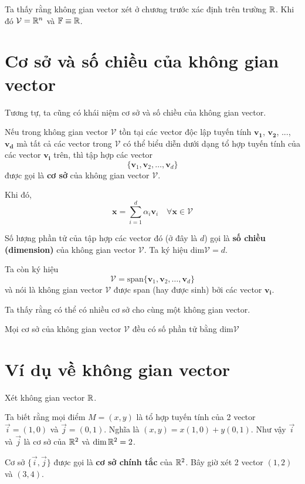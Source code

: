 Ta thấy rằng không gian vector xét ở chương trước xác định trên trường $\mathbb{R}$.
Khi đó $\mathcal{V} = \mathbb{R}^n$ và $\mathbb{F} \equiv \mathbb{R}$.

\section{Cơ sở và số chiều của không gian vector}

Tương tự, ta cũng có khái niệm cơ sở và số chiều của không gian vector.

Nếu trong không gian vector $\mathcal{V}$ tồn tại các vector độc lập tuyến tính $\bm{v_1}$, $\bm{v_2}$, ..., $\bm{v_d}$
mà tất cả các vector trong $\mathcal{V}$ có thể biểu diễn dưới dạng tổ hợp tuyến tính của các vector $\bm{v_i}$ trên,
thì tập hợp các vector 
\[\{ \bm{v}_1, \bm{v}_2, \ldots, \bm{v}_d \}\]
được gọi là \textbf{cơ sở} của không gian vector $\mathcal{V}$.

Khi đó,
\[\bm{x} = \sum_{i=1}^{d} \alpha_i \bm{v}_i \quad \forall \bm{x} \in \mathcal{V}\]

Số lượng phần tử của tập hợp các vector đó (ở đây là $d$) gọi là \textbf{số chiều (dimension)} của không gian vector $\mathcal{V}$.
Ta ký hiệu $\text{dim} \mathcal{V} = d$.

Ta còn ký hiệu 
\[\mathcal{V} = \text{span} \{\bm{v}_1, \bm{v}_2, \ldots, \bm{v}_d\}\]
và nói là không gian vector $\mathcal{V}$ được span (hay được sinh) bởi các vector $\bm{v_i}$.

Ta thấy rằng có thể có nhiều cơ sở cho cùng một không gian vector.

\begin{theorem}
    Mọi cơ sở của không gian vector $\mathcal{V}$ đều có số phần tử bằng $\text{dim} \mathcal{V}$
\end{theorem}

\section{Ví dụ về không gian vector}

Xét không gian vector $\mathbb{R}$.

Ta biết rằng mọi điểm $M = (x, y)$ là tổ hợp tuyến tính 
của 2 vector $\vec{i} = (1, 0)$ và $\vec{j} = (0, 1)$.
Nghĩa là $(x, y) = x (1, 0) + y (0, 1)$. Như vậy $\vec{i}$
và $\vec{j}$ là cơ sở của $\mathbb{R}^2$ và $\dim \mathbb{R}^2 = 2$.

Cơ sở $\{\vec{i}, \vec{j}\}$ được gọi là \textbf{cơ sở chính tắc}
của $\mathbb{R}^2$. Bây giờ xét 2 vector $(1, 2)$ và $(3, 4)$.

